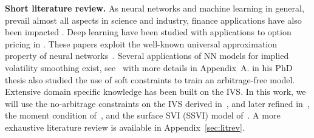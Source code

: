 \textbf{Short literature review.}
As neural networks and machine learning in general, prevail almost all aspects in science and industry, finance applications have also been impacted  \citep{hernandez2007garch, genccay2001pricing, hernandez2013gaussian, cao2003support, heaton2017deep}.
Deep learning have been studied with applications to option pricing in \citep{sirignano2018dgm, han2017overcoming, fujii2017asymptotic, becker2019deep, hutchinson1994nonparametric, liu2019neural, liu2019pricing}.
These papers exploit the well-known universal approximation property of neural networks~\citep{hornik1989multilayer, hornik1991approximation, leshno1993multilayer}.
Several applications of NN models for implied volatility smoothing exist, see~\cite{dugas2001incorporating, zheng2018machine, ludwig2015robust, itkin2015sigmoid, yang2017gated} with more details in Appendix~A.
\cite{zheng2018machine} in his PhD thesis also studied the use of soft constraints to train an arbitrage-free model.
Extensive domain specific knowledge has been built on the IVS.
In this work, we will use the no-arbitrage constraints on the IVS derived in~\cite{roper2010arbitrage}, and later refined in~\cite{guo2016generalized}, the moment condition of~\cite{lee2004moment}, and the surface SVI (SSVI) model of~\cite{gatheral2014arbitrage}.
A more exhaustive literature review is available in Appendix~\ref{sec:litrev}.


